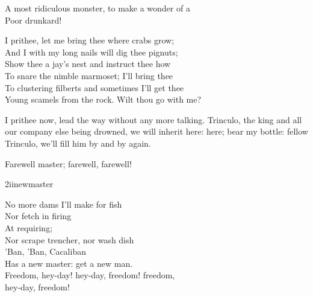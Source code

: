 \begin{verse_speech}[Trinculo]
A most ridiculous monster, to make a wonder of a\\
Poor drunkard!
\end{verse_speech}

\begin{verse_speech}[Caliban] 
I prithee, let me bring thee where crabs grow;\\
And I with my long nails will dig thee pignuts;\\
Show thee a jay's nest and instruct thee how\\
To snare the nimble marmoset; I'll bring thee\\
To clustering filberts and sometimes I'll get thee\\
Young scamels from the rock. Wilt thou go with me?
\end{verse_speech}

\begin{prose_speech}[Stephano] 
I prithee now, lead the way without any more talking. Trinculo, the king and all our company else being drowned, we will inherit here: here; bear my bottle: fellow Trinculo, we'll fill him by and by again.
\end{prose_speech}

\begin{prose_speech}[Caliban] 
Farewell master; farewell, farewell!
\end{prose_speech}

\begin{pictures} %
	\begin{letter}
		\begin{bwbigpic}
			[\picwidth]
			{2iinewmaster}
			{}
		\end{bwbigpic}
	\end{letter}
\end{pictures}


\begin{verse_speech}[Caliban] 
No more dams I'll make for fish\\
Nor fetch in firing\\
At requiring;\\
Nor scrape trencher, nor wash dish\\
'Ban, 'Ban, Cacaliban\\
Has a new master: get a new man.\\
Freedom, hey-day! hey-day, freedom! freedom,\\
hey-day, freedom!
\end{verse_speech}

